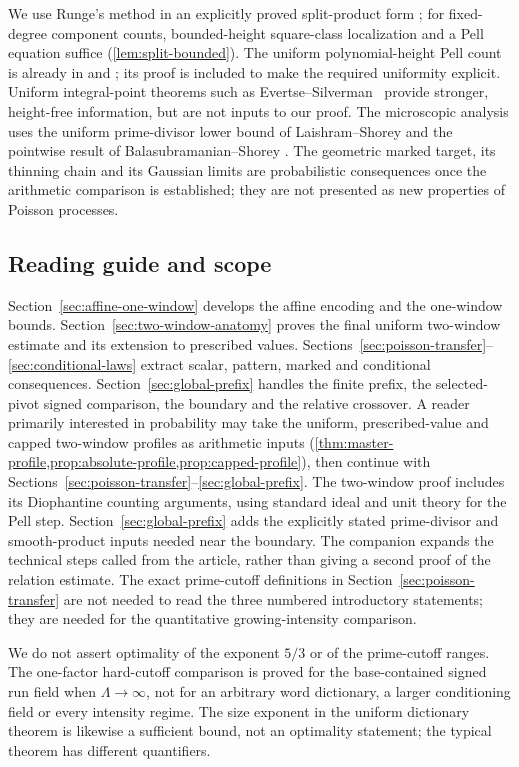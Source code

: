 We use Runge's method in an explicitly proved split-product form
\cite{Runge1887,Walsh1992,Walsh1995Corrections}; for fixed-degree component counts, bounded-height square-class localization
and a Pell equation suffice (\cref{lem:split-bounded}). The uniform
polynomial-height Pell count is already in
\cite[arXiv text, Lemma~4]{CillerueloGaraev2011} and
\cite[Lemma~2.10 and Remark~2.12]{Tao2026}; its proof is included to
make the required uniformity explicit. Uniform integral-point
theorems such as Evertse--Silverman~\cite{EvertseSilverman1986} provide
stronger, height-free information, but are not inputs to our proof.
The microscopic analysis uses
the uniform prime-divisor lower bound of Laishram--Shorey
\cite{LaishramShorey2004} and the pointwise result of
Balasubramanian--Shorey \cite{BalasubramanianShorey1993}.
The geometric marked target, its thinning chain and its Gaussian limits are
probabilistic consequences once the arithmetic comparison is established;
they are not presented as new properties of Poisson processes.

\subsection{Reading guide and scope}
Section~\ref{sec:affine-one-window} develops the affine encoding and the
one-window bounds. Section~\ref{sec:two-window-anatomy} proves the final
uniform two-window estimate and its extension to prescribed values.
Sections~\ref{sec:poisson-transfer}--\ref{sec:conditional-laws} extract scalar,
pattern, marked and conditional consequences. Section~\ref{sec:global-prefix}
handles the finite prefix, the selected-pivot signed comparison, the
boundary and the relative crossover.
A reader primarily interested in probability may take the uniform,
prescribed-value and capped two-window profiles as arithmetic inputs
(\cref{thm:master-profile,prop:absolute-profile,prop:capped-profile}), then
continue with Sections~\ref{sec:poisson-transfer}--\ref{sec:global-prefix}.
The two-window proof includes its Diophantine counting arguments, using
standard ideal and unit theory for the Pell step. Section~\ref{sec:global-prefix}
adds the explicitly stated prime-divisor and smooth-product inputs needed
near the boundary. The companion expands the technical steps called from
the article, rather than giving a second proof of the relation estimate.
The exact prime-cutoff definitions in Section~\ref{sec:poisson-transfer}
are not needed to read the three numbered introductory statements; they
are needed for the quantitative growing-intensity comparison.

We do not assert optimality of the exponent $5/3$ or of the prime-cutoff
ranges. The one-factor hard-cutoff comparison is proved for the
base-contained signed run field when $\Lambda\to\infty$, not for an
arbitrary word dictionary, a larger conditioning field or every intensity
regime. The size exponent in the uniform dictionary theorem is likewise a
sufficient bound, not an optimality statement; the typical theorem has
different quantifiers.
